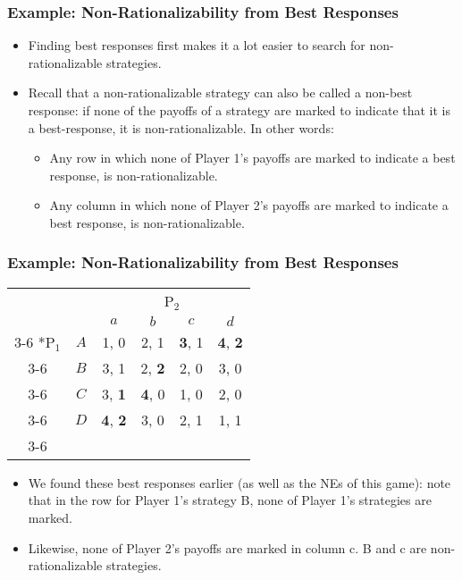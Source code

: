 \begin{frame}
\frametitle{Example: Non-Rationalizability from Best Responses}
\begin{itemize}
\item Finding best responses first makes it a lot easier to search for non-rationalizable strategies.
\item Recall that a non-rationalizable strategy can also be called a non-best response: if none of the payoffs of a strategy are marked to indicate that it is a best-response, it is non-rationalizable. In other words:\begin{itemize}
	\item Any row in which none of Player 1's payoffs are marked to indicate a best response, is non-rationalizable.
	\item Any column in which none of Player 2's payoffs are marked to indicate a best response, is non-rationalizable.
\end{itemize}
\end{itemize}
\end{frame}

\begin{frame}
\frametitle{Example: Non-Rationalizability from Best Responses}
\begin{table}[h]
	\centering
	\begin{tabular}{cc|c|c|c|c|}
		& \multicolumn{1}{c}{} & \multicolumn{4}{c}{P$_2$}\\
		& \multicolumn{1}{c}{} & \multicolumn{1}{c}{$a$} & \multicolumn{1}{c}{$b$} & \multicolumn{1}{c}{$c$} & \multicolumn{1}{c}{$d$} \\\cline{3-6}
		\multirow{4}*{P$_1$}  & $A$ & 1, 0 & 2, 1 & \textbf{3}, 1 & \textbf{4}, \textbf{2} \\\cline{3-6}
		& $B$ & 3, 1 & 2, \textbf{2} & 2, 0 & 3, 0 \\\cline{3-6}
		& $C$ & 3, \textbf{1} & \textbf{4}, 0 & 1, 0 & 2, 0 \\\cline{3-6}
		& $D$ & \textbf{4}, \textbf{2} & 3, 0 & 2, 1 & 1, 1 \\\cline{3-6}
	\end{tabular}
\end{table}
\begin{itemize}
	\item We found these best responses earlier (as well as the NEs of this game): note that in the row for Player 1's strategy B, none of Player 1's strategies are marked.
	\item Likewise, none of Player 2's payoffs are marked in column c. B and c are non-rationalizable strategies.
\end{itemize}
\end{frame}

